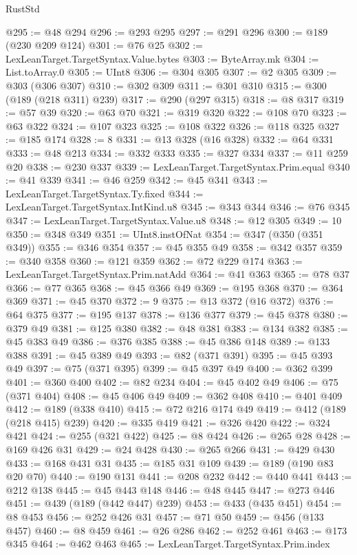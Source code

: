 \begin{lexlean}{RustStd}
\begin{coremodule}
@295 := @48 @294
@296 := @293 @295
@297 := @291 @296
@300 := @189 (@230 @209 @124)
@301 := @76 @25
@302 := LexLeanTarget.TargetSyntax.Value.bytes
@303 := ByteArray.mk
@304 := List.toArray.{0}
@305 := UInt8
@306 := @304 @305
@307 := @2 @305
@309 := @303 (@306 @307)
@310 := @302 @309
@311 := @301 @310
@315 := @300 (@189 (@218 @311) @239)
@317 := @290 (@297 @315)
@318 := @8 @317
@319 := @57 @39
@320 := @63 @70
@321 := @319 @320
@322 := @108 @70
@323 := @63 @322
@324 := @107 @323
@325 := @108 @322
@326 := @118 @325
@327 := @185 @174
@328 := 8
@331 := @13 @328 (@16 @328)
@332 := @64 @331
@333 := @48 @213
@334 := @332 @333
@335 := @327 @334
@337 := @11 @259 @20
@338 := @230 @337
@339 := LexLeanTarget.TargetSyntax.Prim.equal
@340 := @41 @339
@341 := @46 @259
@342 := @45 @341
@343 := LexLeanTarget.TargetSyntax.Ty.fixed
@344 := LexLeanTarget.TargetSyntax.IntKind.u8
@345 := @343 @344
@346 := @76 @345
@347 := LexLeanTarget.TargetSyntax.Value.u8
@348 := @12 @305
@349 := 10
@350 := @348 @349
@351 := UInt8.instOfNat
@354 := @347 (@350 (@351 @349))
@355 := @346 @354
@357 := @45 @355 @49
@358 := @342 @357
@359 := @340 @358
@360 := @121 @359
@362 := @72 @229 @174
@363 := LexLeanTarget.TargetSyntax.Prim.natAdd
@364 := @41 @363
@365 := @78 @37
@366 := @77 @365
@368 := @45 @366 @49
@369 := @195 @368
@370 := @364 @369
@371 := @45 @370
@372 := 9
@375 := @13 @372 (@16 @372)
@376 := @64 @375
@377 := @195 @137
@378 := @136 @377
@379 := @45 @378
@380 := @379 @49
@381 := @125 @380
@382 := @48 @381
@383 := @134 @382
@385 := @45 @383 @49
@386 := @376 @385
@388 := @45 @386 @148
@389 := @133 @388
@391 := @45 @389 @49
@393 := @82 (@371 @391)
@395 := @45 @393 @49
@397 := @75 (@371 @395)
@399 := @45 @397 @49
@400 := @362 @399
@401 := @360 @400
@402 := @82 @234
@404 := @45 @402 @49
@406 := @75 (@371 @404)
@408 := @45 @406 @49
@409 := @362 @408
@410 := @401 @409
@412 := @189 (@338 @410)
@415 := @72 @216 @174 @49
@419 := @412 (@189 (@218 @415) @239)
@420 := @335 @419
@421 := @326 @420
@422 := @324 @421
@424 := @255 (@321 @422)
@425 := @8 @424
@426 := @265 @28
@428 := @169 @426 @31
@429 := @24 @428
@430 := @265 @266
@431 := @429 @430
@433 := @168 @431 @31
@435 := @185 @31 @109
@439 := @189 (@190 @83 @20 @70)
@440 := @190 @131
@441 := @208 @232
@442 := @440 @441
@443 := @212 @138
@445 := @45 @443 @148
@446 := @48 @445
@447 := @273 @446
@451 := @439 (@189 (@442 @447) @239)
@453 := @433 (@435 @451)
@454 := @8 @453
@456 := @252 @426 @31
@457 := @71 @50
@459 := @456 (@133 @457)
@460 := @8 @459
@461 := @26 @286
@462 := @252 @461
@463 := @173 @345
@464 := @462 @463
@465 := LexLeanTarget.TargetSyntax.Prim.index

\end{coremodule}
\end{lexlean}
